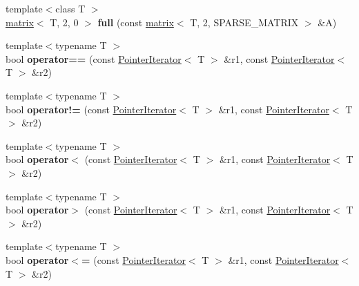 \begin{DoxyCompactItemize}
\item 
\hypertarget{namespacekeycpp_a72e99f8ba51f0a533bb512cdd01be66e}{{\footnotesize template$<$class T $>$ }\\\hyperlink{classkeycpp_1_1matrix}{matrix}$<$ T, 2, 0 $>$ {\bfseries full} (const \hyperlink{classkeycpp_1_1matrix}{matrix}$<$ T, 2, S\-P\-A\-R\-S\-E\-\_\-\-M\-A\-T\-R\-I\-X $>$ \&A)}\label{namespacekeycpp_a72e99f8ba51f0a533bb512cdd01be66e}

\item 
\hypertarget{namespacekeycpp_adfb32fd99bb09455f5a124df4560ab0f}{{\footnotesize template$<$typename T $>$ }\\bool {\bfseries operator==} (const \hyperlink{classkeycpp_1_1_pointer_iterator}{Pointer\-Iterator}$<$ T $>$ \&r1, const \hyperlink{classkeycpp_1_1_pointer_iterator}{Pointer\-Iterator}$<$ T $>$ \&r2)}\label{namespacekeycpp_adfb32fd99bb09455f5a124df4560ab0f}

\item 
\hypertarget{namespacekeycpp_a9358d5f3f08dd8ed262697b7e8b2a4f1}{{\footnotesize template$<$typename T $>$ }\\bool {\bfseries operator!=} (const \hyperlink{classkeycpp_1_1_pointer_iterator}{Pointer\-Iterator}$<$ T $>$ \&r1, const \hyperlink{classkeycpp_1_1_pointer_iterator}{Pointer\-Iterator}$<$ T $>$ \&r2)}\label{namespacekeycpp_a9358d5f3f08dd8ed262697b7e8b2a4f1}

\item 
\hypertarget{namespacekeycpp_a689a724b505d52660e42e1148eba1a9a}{{\footnotesize template$<$typename T $>$ }\\bool {\bfseries operator$<$} (const \hyperlink{classkeycpp_1_1_pointer_iterator}{Pointer\-Iterator}$<$ T $>$ \&r1, const \hyperlink{classkeycpp_1_1_pointer_iterator}{Pointer\-Iterator}$<$ T $>$ \&r2)}\label{namespacekeycpp_a689a724b505d52660e42e1148eba1a9a}

\item 
\hypertarget{namespacekeycpp_a7330eaaa701d2308c19f84adda097685}{{\footnotesize template$<$typename T $>$ }\\bool {\bfseries operator$>$} (const \hyperlink{classkeycpp_1_1_pointer_iterator}{Pointer\-Iterator}$<$ T $>$ \&r1, const \hyperlink{classkeycpp_1_1_pointer_iterator}{Pointer\-Iterator}$<$ T $>$ \&r2)}\label{namespacekeycpp_a7330eaaa701d2308c19f84adda097685}

\item 
\hypertarget{namespacekeycpp_a9b02f40e92cad47b419ac09207518b9f}{{\footnotesize template$<$typename T $>$ }\\bool {\bfseries operator$<$=} (const \hyperlink{classkeycpp_1_1_pointer_iterator}{Pointer\-Iterator}$<$ T $>$ \&r1, const \hyperlink{classkeycpp_1_1_pointer_iterator}{Pointer\-Iterator}$<$ T $>$ \&r2)}\label{namespacekeycpp_a9b02f40e92cad47b419ac09207518b9f}


\end{DoxyCompactItemize}
